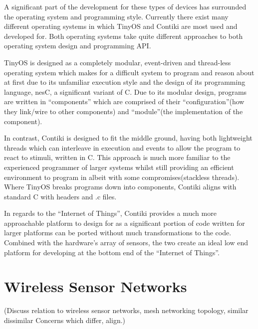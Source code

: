 A significant part of the development for these types of devices has surrounded the operating system and programming style. Currently there exist many different operating systems in which TinyOS and Contiki are most used and developed for. Both operating systems take quite different approaches to both operating system design and programming API. 

TinyOS is designed as a completely modular, event-driven and thread-less operating system which makes for a difficult system to program and reason about at first due to its unfamiliar execution style and the design of its programming language, nesC, a significant variant of C. Due to its modular design, programs are written in ``components'' which are comprised of their ``configuration''(how they link/wire to other components) and ``module''(the implementation of the component). 

In contrast, Contiki is designed to fit the middle ground, having both lightweight threads which can interleave in execution and events to allow the program to react to stimuli, written in C. This approach is much more familiar to the experienced programmer of larger systems whilst still providing an efficient environment to program in albeit with some compromises(stackless threads). Where TinyOS breaks programs down into components, Contiki aligns with standard C with headers and .c files.

In regards to the ``Internet of Things'', Contiki provides a much more approachable platform to design for as a significant portion of code written for larger platforms can be ported without much transformations to the code. Combined with the hardware's array of sensors, the two create an ideal low end platform for developing at the bottom end of the ``Internet of Things''.

\section{Wireless Sensor Networks} %
\label{sec:wireless_sensor_networks}
(Discuss relation to wireless sensor networks, mesh networking topology, similar dissimilar
Concerns which differ, align.)

